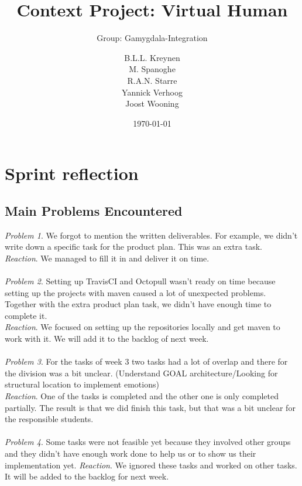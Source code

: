 \documentclass{scrartcl}
\begin{document}
\title{Context Project: Virtual Human}
\subtitle{Group: Gamygdala-Integration}
\date{\today{}}

\author{
    \begin{tabular}{l r}
      B.L.L. Kreynen\\
      M. Spanoghe\\
      R.A.N. Starre\\
      Yannick Verhoog\\
      Joost Wooning\\
    \end{tabular}
}

\maketitle \thispagestyle{empty} \pagebreak

\section{Sprint reflection}

\subsection{Main Problems Encountered}

\emph{Problem 1}. We forgot to mention the written deliverables. For example, we didn't write down a specific task for the product plan. This was an extra task.\\
\emph{Reaction}. We managed to fill it in and deliver it on time.\\
\\
\emph{Problem 2}. Setting up TravisCI and Octopull wasn't ready on time because setting up the projects with maven caused a lot of unexpected problems. Together with the extra product plan task, we didn't have enough time to complete it.\\
\emph{Reaction}. We focused on setting up the repositories locally and get maven to work with it. We will add it to the backlog of next week.\\
\\
\emph{Problem 3}. For the tasks of week 3 two tasks had a lot of overlap and there for the division was a bit unclear. (Understand GOAL architecture/Looking for structural location to implement emotions)\\
\emph{Reaction}. One of the tasks is completed and the other one is only completed partially. The result is that we did finish this task, but that was a bit unclear for the responsible students.\\
\\
\emph{Problem 4}. Some tasks were not feasible yet because they involved other groups and they didn't have enough work done to help us or to show us their implementation yet.
\emph{Reaction}. We ignored these tasks and worked on other tasks. It will be added to the backlog for next week.
\end{document}
